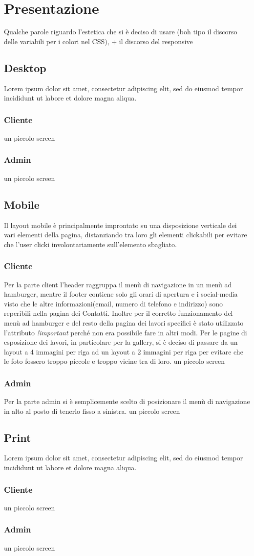 \section{Presentazione}
Qualche parole riguardo l'estetica che si è deciso di usare (boh tipo il discorso delle variabili per i colori nel CSS), + il discorso del responsive
\subsection{Desktop}
Lorem ipsum dolor sit amet, consectetur adipiscing elit, sed do eiusmod tempor incididunt ut labore et dolore magna aliqua. 
\subsubsection{Cliente}
un piccolo screen
\subsubsection{Admin}
un piccolo screen

\subsection{Mobile}
Il layout mobile è principalmente improntato su una disposizione verticale dei vari elementi della pagina, distanziando tra loro gli elementi clickabili per evitare che l'user clicki involontariamente sull'elemento sbagliato. 
\subsubsection{Cliente}
Per la parte client l'header raggruppa il menù di navigazione in un menù ad hamburger, mentre il footer contiene solo gli orari di apertura e i social-media visto che le altre informazioni(email, numero di telefono e indirizzo) sono reperibili nella pagina dei Contatti. Inoltre per il corretto funzionamento del menù ad hamburger e del resto della pagina dei lavori specifici è stato utilizzato l'attributo \textit{!important} perché non era possibile fare in altri modi. Per le pagine di esposizione dei lavori, in particolare per la gallery, si è deciso di passare da un layout a 4 immagini per riga ad un layout a 2 immagini per riga per evitare che le foto fossero troppo piccole e troppo vicine tra di loro. 
un piccolo screen
\subsubsection{Admin}
Per la parte admin si è semplicemente scelto di posizionare il menù di navigazione in alto al posto di tenerlo fisso a sinistra.
un piccolo screen

\subsection{Print}
Lorem ipsum dolor sit amet, consectetur adipiscing elit, sed do eiusmod tempor incididunt ut labore et dolore magna aliqua. 
\subsubsection{Cliente}
un piccolo screen
\subsubsection{Admin}
un piccolo screen

